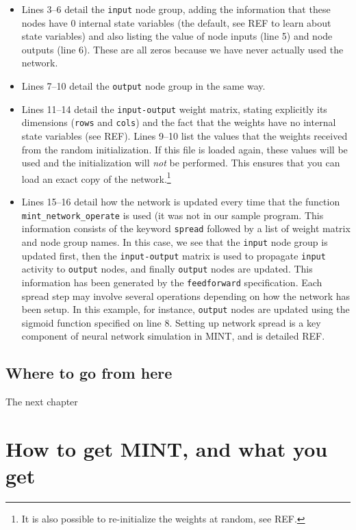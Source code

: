 \documentclass[12pt,letterpaper]{memoir}
\newcommand{\mint}{MINT\xspace}
\begin{document}
\begin{itemize}
\item Lines 3--6 detail the \lstinline{input} node group, adding the
  information that these nodes have 0 internal state variables (the
  default, see REF to learn about state variables) and also listing
  the value of node inputs (line 5) and node outputs (line 6). These
  are all zeros because we have never actually used the network.
\item Lines 7--10 detail the \lstinline{output} node group in the same
  way.
\item Lines 11--14 detail the \lstinline{input-output} weight matrix,
  stating explicitly its dimensions (\lstinline{rows} and
  \lstinline{cols}) and the fact that the weights have no internal
  state variables (see REF). Lines 9--10 list the values that the
  weights received from the random initialization. If this file is
  loaded again, these values will be used and the initialization will
  \textit{not} be performed. This ensures that you can load an exact
  copy of the network.\footnote{It is also possible to re-initialize
    the weights at random, see REF.}
\item Lines 15--16 detail how the network is updated every time that
  the function \lstinline{mint_network_operate} is used (it was not in
  our sample program. This information consists of the keyword
  \lstinline{spread} followed by a list of weight matrix and node
  group names. In this case, we see that the \lstinline{input} node
  group is updated first, then the \lstinline{input-output} matrix is
  used to propagate \lstinline{input} activity to \lstinline{output}
  nodes, and finally \lstinline{output} nodes are updated. This
  information has been generated by the \lstinline{feedforward}
  specification. Each spread step may involve several operations
  depending on how the network has been setup. In this example, for
  instance, \lstinline{output} nodes are updated using the sigmoid
  function specified on line 8. Setting up network spread is a key
  component of neural network simulation in \mint, and is detailed
  REF.
\end{itemize}

\section{Where to go from here}

The next chapter 
\chapter{How to get \mint, and what you get}
\label{sec:install}
\end{document}
